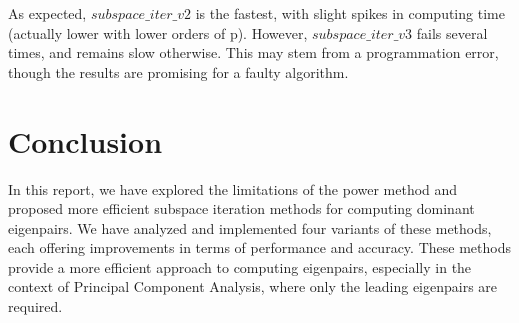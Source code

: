 \documentclass{article}
\begin{document}
As expected, $subspace\_iter\_v2$ is the fastest, with slight spikes in computing time (actually lower with lower orders of p).
However, $subspace\_iter\_v3$ fails several times, and remains slow otherwise. This may stem from a programmation error, though the results are promising for a faulty algorithm.

\section*{Conclusion}

In this report, we have explored the limitations of the power method and proposed more efficient subspace iteration methods for computing dominant eigenpairs. We have analyzed and implemented four variants of these methods, each offering improvements in terms of performance and accuracy. These methods provide a more efficient approach to computing eigenpairs, especially in the context of Principal Component Analysis, where only the leading eigenpairs are required.
\end{document}

